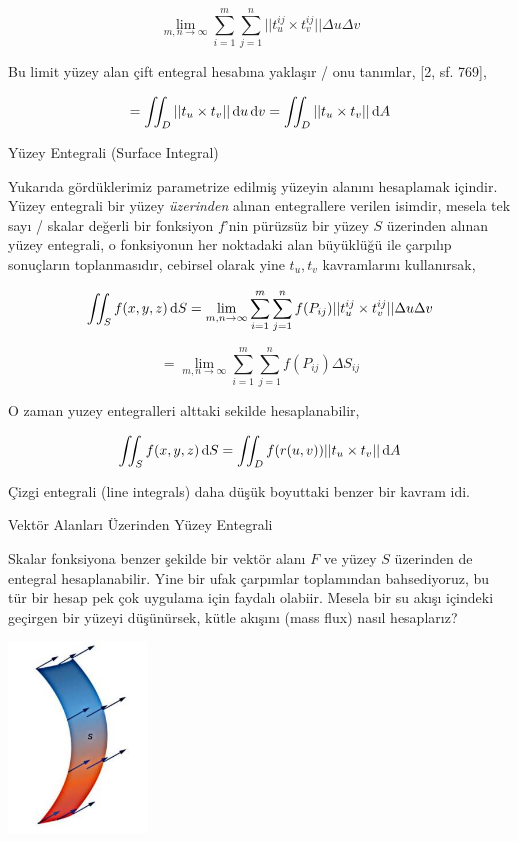 \documentclass[12pt,fleqn]{article}\usepackage{../../common}
\begin{document}
$$
\lim_{m,n \to \infty} \sum_{i=1}^{m} \sum_{j=1}^{n} || t_u^{ij} \times t_v^{ij} || \Delta u \Delta v
$$

Bu limit yüzey alan çift entegral hesabına yaklaşır / onu tanımlar, [2, sf. 769],

$$
= \iint_D || t_u \times t_v || \,\mathrm{d} u \,\mathrm{d} v = \iint_D || t_u \times t_v || \,\mathrm{d} A
$$

Yüzey Entegrali (Surface Integral)

Yukarıda gördüklerimiz parametrize edilmiş yüzeyin alanını hesaplamak içindir.
Yüzey entegrali bir yüzey {\em üzerinden} alınan entegrallere verilen isimdir,
mesela tek sayı / skalar değerli bir fonksiyon $f$'nin pürüzsüz bir yüzey $S$
üzerinden alınan yüzey entegrali, o fonksiyonun her noktadaki alan büyüklüğü ile
çarpılıp sonuçların toplanmasıdır, cebirsel olarak yine $t_u,t_v$ kavramlarını
kullanırsak,

$$
\iint_S f(x,y,z) \,\mathrm{d} S 
= \lim_{m,n \to \infty} \sum_{i=1}^{m} \sum_{j=1}^{n} f(P_{ij}) || t_u^{ij} \times t_v^{ij} || \Delta u \Delta v
$$

$$
= \lim_{m,n \to \infty} \sum_{i=1}^{m} \sum_{j=1}^{n} f(P_{ij}) \Delta S_{ij} 
$$

O zaman yuzey entegralleri alttaki sekilde hesaplanabilir,

$$
\iint_S f(x,y,z) \,\mathrm{d} S =
\iint_D f(r(u,v)) || t_u \times t_v || \,\mathrm{d} A
$$

Çizgi entegrali (line integrals) daha düşük boyuttaki benzer bir kavram idi.

Vektör Alanları Üzerinden Yüzey Entegrali

Skalar fonksiyona benzer şekilde bir vektör alanı $F$ ve yüzey $S$ üzerinden de
entegral hesaplanabilir. Yine bir ufak çarpımlar toplamından bahsediyoruz, bu
tür bir hesap pek çok uygulama için faydalı olabiir. Mesela bir su akışı
içindeki geçirgen bir yüzeyi düşünürsek, kütle akışını (mass flux) nasıl
hesaplarız? 

\includegraphics[width=10em]{calc_multi_75_app_04.jpg}
\end{document}
